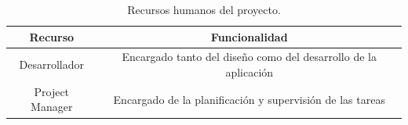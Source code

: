 \begin{table}[h]
\begin{center}
\begin{tabular}{@{}cc@{}}
\toprule
\textbf{Recurso} & \textbf{Funcionalidad}                                          \\ \midrule
Desarrollador    & Encargado tanto del diseño como del desarrollo de la aplicación \\
Project Manager  & Encargado de la planificación y supervisión de las tareas \\ \bottomrule
\end{tabular}
\end{center}
\caption{Recursos humanos del proyecto. \label{tab:recursosHum}}
\end{table}